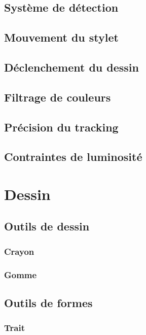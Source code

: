 \documentclass[11pt,a4paper,oldfontcommands]{memoir}
\begin{document}
\subsection{Système de détection}

\subsection{Mouvement du stylet}

\subsection{Déclenchement du dessin}

\subsection{Filtrage de couleurs}

\subsection{Précision du tracking}

\subsection{Contraintes de luminosité}

\newpage

\section{Dessin}

\subsection{Outils de dessin}

\subsubsection{Crayon}

\subsubsection{Gomme}

\subsection{Outils de formes}

\subsubsection{Trait}
\end{document}

